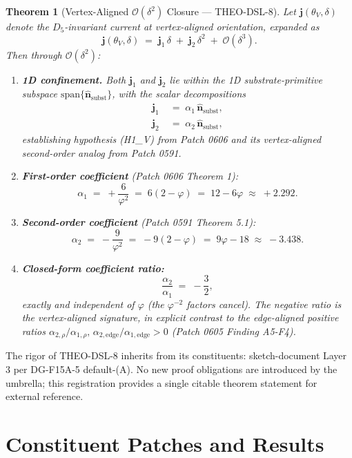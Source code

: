 \documentclass[11pt]{article}
\newtheorem{theorem}{Theorem}
\begin{document}
\begin{theorem}[Vertex-Aligned $\mathcal{O}(\delta^2)$ Closure --- THEO-DSL-8]
\label{thm:THEO-DSL-8}
Let $\mathbf{j}(\theta_V, \delta)$ denote the $D_5$-invariant current at
vertex-aligned orientation, expanded as
\[
\mathbf{j}(\theta_V, \delta) \;=\; \mathbf{j}_1\,\delta \;+\; \mathbf{j}_2\,\delta^2
\;+\; \mathcal{O}(\delta^3).
\]
Then through $\mathcal{O}(\delta^2)$:
\begin{enumerate}
\item[\textnormal{(i)}] \textbf{1D confinement.} Both $\mathbf{j}_1$ and
$\mathbf{j}_2$ lie within the 1D substrate-primitive subspace
$\mathrm{span}\{\hat{\mathbf{n}}_{\text{subst}}\}$, with the scalar
decompositions
\begin{align}
\mathbf{j}_1 &\;=\; \alpha_1\,\hat{\mathbf{n}}_{\text{subst}}, \\
\mathbf{j}_2 &\;=\; \alpha_2\,\hat{\mathbf{n}}_{\text{subst}},
\end{align}
establishing hypothesis (H1\_V) from Patch 0606 and its
vertex-aligned second-order analog from Patch 0591.

\item[\textnormal{(ii)}] \textbf{First-order coefficient} (Patch 0606
Theorem 1):
\[
\alpha_1 \;=\; +\frac{6}{\varphi^2} \;=\; 6(2-\varphi) \;=\; 12 - 6\varphi
\;\approx\; +2.292.
\]

\item[\textnormal{(iii)}] \textbf{Second-order coefficient} (Patch 0591
Theorem 5.1):
\[
\alpha_2 \;=\; -\frac{9}{\varphi^2} \;=\; -9(2-\varphi) \;=\; 9\varphi - 18
\;\approx\; -3.438.
\]

\item[\textnormal{(iv)}] \textbf{Closed-form coefficient ratio:}
\[
\frac{\alpha_2}{\alpha_1} \;=\; -\frac{3}{2},
\]
exactly and independent of $\varphi$ (the $\varphi^{-2}$ factors cancel).
The negative ratio is the vertex-aligned signature, in explicit contrast
to the edge-aligned positive ratios
$\alpha_{2,\rho}/\alpha_{1,\rho},\,
\alpha_{2,\text{edge}}/\alpha_{1,\text{edge}} > 0$ (Patch 0605
Finding A5-F4).
\end{enumerate}
\end{theorem}

\medskip
The rigor of THEO-DSL-8 inherits from its constituents: sketch-document
Layer 3 per DG-F15A-5 default-(A). No new proof obligations are
introduced by the umbrella; this registration provides a single citable
theorem statement for external reference.

\section{Constituent Patches and Results}
\end{document}

